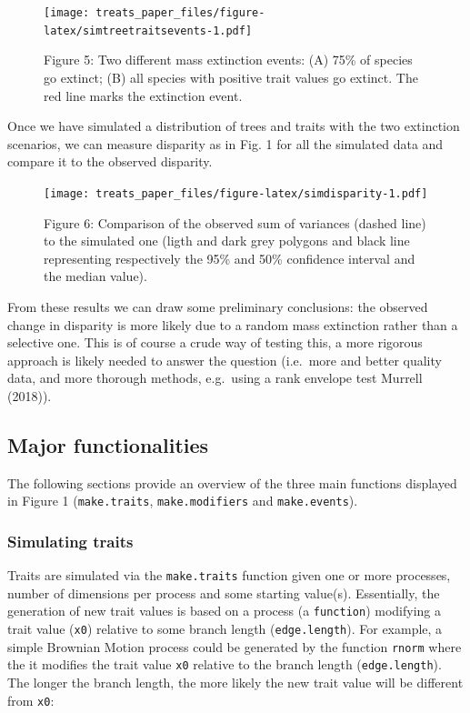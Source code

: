 \documentclass[
]{article}
\begin{document}
\begin{figure}
\centering
\texttt{[image: treats\_paper\_files/figure-latex/simtreetraitsevents-1.pdf]}
\caption{Figure 5: Two different mass extinction events: (A) 75\% of
species go extinct; (B) all species with positive trait values go
extinct. The red line marks the extinction event.}
\end{figure}

Once we have simulated a distribution of trees and traits with the two
extinction scenarios, we can measure disparity as in Fig. 1 for all the
simulated data and compare it to the observed disparity.

\begin{figure}
\centering
\texttt{[image: treats\_paper\_files/figure-latex/simdisparity-1.pdf]}
\caption{Figure 6: Comparison of the observed sum of variances (dashed
line) to the simulated one (ligth and dark grey polygons and black line
representing respectively the 95\% and 50\% confidence interval and the
median value).}
\end{figure}

From these results we can draw some preliminary conclusions: the
observed change in disparity is more likely due to a random mass
extinction rather than a selective one. This is of course a crude way of
testing this, a more rigorous approach is likely needed to answer the
question (i.e.~more and better quality data, and more thorough methods,
e.g.~using a rank envelope test Murrell (2018)).

\hypertarget{major-functionalities}{%
\subsection{Major functionalities}\label{major-functionalities}}

The following sections provide an overview of the three main functions
displayed in Figure 1 (\texttt{make.traits}, \texttt{make.modifiers} and
\texttt{make.events}).

\hypertarget{simulating-traits}{%
\subsubsection{Simulating traits}\label{simulating-traits}}

Traits are simulated via the \texttt{make.traits} function given one or
more processes, number of dimensions per process and some starting
value(s). Essentially, the generation of new trait values is based on a
process (a \texttt{function}) modifying a trait value (\texttt{x0})
relative to some branch length (\texttt{edge.length}). For example, a
simple Brownian Motion process could be generated by the function
\texttt{rnorm} where the it modifies the trait value \texttt{x0}
relative to the branch length (\texttt{edge.length}). The longer the
branch length, the more likely the new trait value will be different
from \texttt{x0}:
\end{document}
